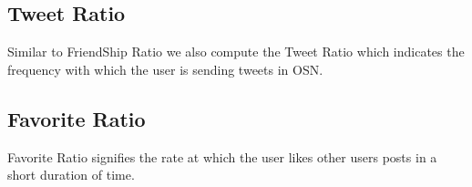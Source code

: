 \documentclass[conference]{IEEEtran}
\begin{document}
\subsection{Tweet Ratio}
Similar to FriendShip Ratio we also compute the Tweet Ratio which indicates the frequency with which the user is sending tweets in OSN.
	


\subsection{Favorite Ratio}
Favorite Ratio signifies the rate at which the user likes other users posts in a short duration of time. 





\end{document}
